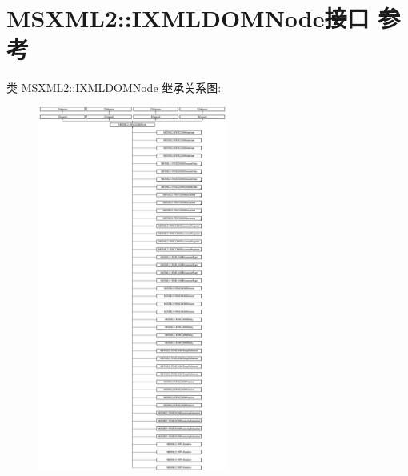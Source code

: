 \hypertarget{interface_m_s_x_m_l2_1_1_i_x_m_l_d_o_m_node}{}\section{M\+S\+X\+M\+L2\+:\+:I\+X\+M\+L\+D\+O\+M\+Node接口 参考}
\label{interface_m_s_x_m_l2_1_1_i_x_m_l_d_o_m_node}
类 M\+S\+X\+M\+L2\+:\+:I\+X\+M\+L\+D\+O\+M\+Node 继承关系图\+:\begin{figure}[H]
\begin{center}
\leavevmode
\includegraphics[height=12.000000cm]{interface_m_s_x_m_l2_1_1_i_x_m_l_d_o_m_node}
\end{center}
\end{figure}
